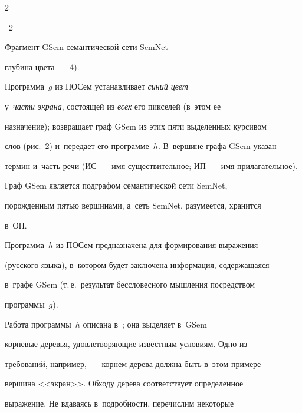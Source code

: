 \begin{multicols}{2}
{\begin{center}
{{\figurename~2}\ \ \small{

Фрагмент GSem семантической сети SemNet

}}

\end{center}

}



\vspace*{9pt}



\noindent

 глубина цвета~--- 4). 

Программа~$g$ из ПОСем уста\-нав\-ли\-ва\-ет \textit{синий цвет} 

у~\textit{части экрана}, со\-сто\-ящей из \textit{всех} его пикселей (в~этом ее 

назначение); возвращает граф GSem из этих пяти выделенных кур\-си\-вом 

слов (рис.~2) и~передает его программе~$h$. В~вершине графа GSem указан 

термин и~часть речи (ИС~--- имя существительное; ИП~--- имя прилагательное).





     

  Граф GSem является подграфом семантической сети SemNet, 

по\-рож\-ден\-ным пятью вершинами, а~сеть SemNet, разумеется, хранится 

в~ОП.

  

  Программа~$h$ из ПОСем предназначена для формирования выражения 

(русского языка), в~котором будет заключена информация, со\-дер\-жа\-ща\-яся 

в~графе GSem (т.\,е.\ результат бес\-сло\-вес\-но\-го мыш\-ле\-ния по\-сред\-ст\-вом 

программы~$g$).

  

  Работа программы~$h$ описана в~\cite{5-sh}; она выделяет в~GSem 

корневые деревья, удовле\-тво\-ря\-ющие известным условиям. Одно из 

требований, например,~--- кор\-нем дерева должна быть в~этом примере 

вершина <<экран>>. Обходу дерева соответствует определенное 

выражение. Не вдаваясь в~под\-роб\-но\-сти, пе\-ре\-чис\-лим некоторые 


\end{multicols}
